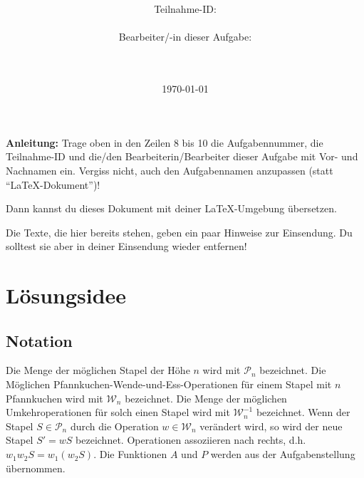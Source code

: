 \documentclass[a4paper,10pt,ngerman]{scrartcl}
\title{\textbf{\Huge\Aufgabe}}
\author{\LARGE Teilnahme-ID: \LARGE \TeilnahmeId \\\\
  \LARGE Bearbeiter/-in dieser Aufgabe: \\
  \LARGE \Name\\\\}
\date{\LARGE\today}
\begin{document}
\maketitle
\tableofcontents

\vspace{0.5cm}

\textbf{Anleitung:} Trage oben in den Zeilen 8 bis 10 die Aufgabennummer, die Teilnahme-ID und die/den Bearbeiterin/Bearbeiter dieser Aufgabe mit Vor- und Nachnamen ein.
Vergiss nicht, auch den Aufgabennamen anzupassen (statt "`\LaTeX-Dokument"')!

Dann kannst du dieses Dokument mit deiner \LaTeX-Umgebung übersetzen.

Die Texte, die hier bereits stehen, geben ein paar Hinweise zur Einsendung. Du
solltest sie aber in deiner Einsendung wieder entfernen!

\section{Lösungsidee}
\subsection{Notation}
Die Menge der möglichen Stapel der Höhe $n$ wird mit $\mathcal{P}_n$ bezeichnet.
Die Möglichen Pfannkuchen-Wende-und-Ess-Operationen für einem Stapel mit $n$ Pfannkuchen
wird mit $\mathcal{W}_n$ bezeichnet. Die Menge der möglichen Umkehroperationen für solch einen Stapel
wird mit $\mathcal{W}^{-1}_n$ bezeichnet. Wenn der Stapel $S \in \mathcal{P}_n$ durch die Operation
$w \in \mathcal{W}_n$ verändert wird, so wird der neue Stapel $S' = w S$ bezeichnet. Operationen
assoziieren nach rechts, d.h. $w_1 w_2 S = w_1 (w_2 S)$. Die Funktionen $A$ und $P$ werden aus
der Aufgabenstellung übernommen.
\end{document}
